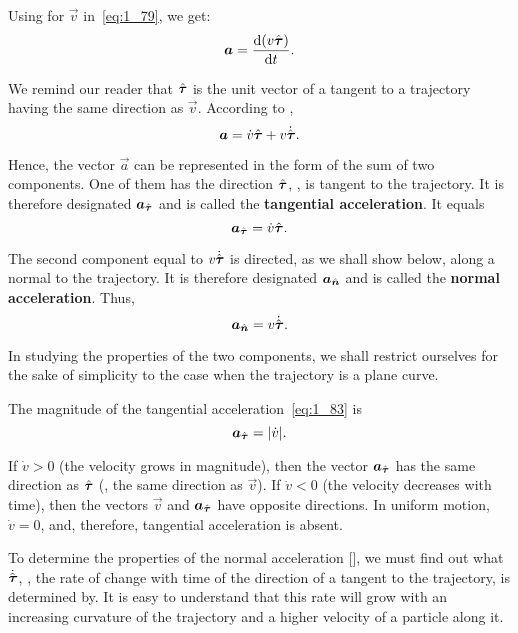 Using  for $\vec{v}$ in~\eqref{eq:1_79}, we get:
\begin{equation}\label{eq:1_81}
\boldsymbol{a} = \frac{\mathrm{d}(v\hat{\boldsymbol{\tau}})}{\mathrm{d} t}.
\end{equation}

\noindent
We remind our reader that $\hat{\boldsymbol{\tau}}$ is the unit vector of a tangent to a trajectory having the same direction as $\vec{v}$. According to ,
\begin{equation}\label{eq:1_82}
\boldsymbol{a} = \dot{v}\hat{\boldsymbol{\tau}} + v\dot{\hat{\boldsymbol{\tau}}}.
\end{equation}

\noindent
Hence, the vector $\vec{a}$ can be represented in the form of the sum of two components. One of them has the direction $\hat{\boldsymbol{\tau}}$, \ie, is tangent to the trajectory. It is therefore designated $\boldsymbol{a}_{\hat{\boldsymbol{\tau}}}$ and is called the \textbf{tangential acceleration}. It equals
\begin{equation}\label{eq:1_83}
\boldsymbol{a}_{\hat{\boldsymbol{\tau}}} = \dot{v}\hat{\boldsymbol{\tau}}.
\end{equation}

\noindent
The second component equal to $v\dot{\hat{\boldsymbol{\tau}}}$ is directed, as we shall show below, along a normal to the trajectory. It is therefore designated $\boldsymbol{a}_{\hat{\boldsymbol{n}}}$ and is called the \textbf{normal acceleration}. Thus,
\begin{equation}\label{eq:1_84}
\boldsymbol{a}_{\hat{\boldsymbol{n}}} = v\dot{\hat{\boldsymbol{\tau}}}.
\end{equation}

In studying the properties of the two components, we shall restrict ourselves for the sake of simplicity to the case when the trajectory is a plane curve.

The magnitude of the tangential acceleration~\eqref{eq:1_83} is
\begin{equation}\label{eq:1_85}
\boldsymbol{a}_{\hat{\boldsymbol{\tau}}} = |\dot{v}|.
\end{equation}

\noindent
If $\dot{v}>0$ (the velocity grows in magnitude), then the vector $\boldsymbol{a}_{\hat{\boldsymbol{\tau}}}$ has the same direction as $\hat{\boldsymbol{\tau}}$ (\ie, the same direction as $\vec{v}$). If $\dot{v}<0$ (the velocity decreases with time), then the vectors $\vec{v}$ and $\boldsymbol{a}_{\hat{\boldsymbol{\tau}}}$ have opposite directions. In uniform motion, $\dot{v}=0$, and, therefore, tangential acceleration is absent.

To determine the properties of the normal acceleration [], we must find out what $\dot{\hat{\boldsymbol{\tau}}}$, \ie, the rate of change with time of the direction of a tangent to the trajectory, is determined by. It is easy to understand that this rate will grow with an increasing curvature of the trajectory and a higher velocity of a particle along it. 

